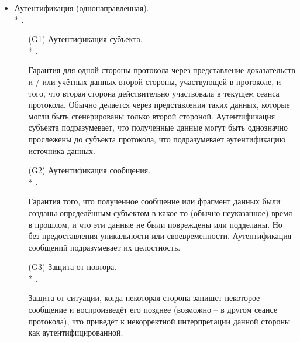 \begin{itemize}
	\item Аутентификация (однонаправленная).\\*
		.
	\begin{itemize}
		\item[(G1)] Аутентификация субъекта.\\*
			.
		\item[{}] Гарантия для одной стороны протокола через представление доказательств и / или учётных данных второй стороны, участвующей в протоколе, и того, что вторая сторона действительно участвовала в текущем сеанса протокола. Обычно делается через представления таких данных, которые могли быть сгенерированы только второй стороной. Аутентификация субъекта подразумевает, что полученные данные могут быть однозначно прослежены до субъекта протокола, что подразумевает аутентификацию источника данных.
		\item[(G2)] Аутентификация сообщения.\\*
			.
		\item[{}] Гарантия того, что полученное сообщение или фрагмент данных были созданы определённым субъектом в какое-то (обычно неуказанное) время в прошлом, и что эти данные не были повреждены или подделаны. Но без предоставления уникальности или своевременности. Аутентификация сообщений подразумевает их целостность.
		\item[(G3)] Защита от повтора.\\*
			.
		\item[{}] Защита от ситуации, когда некоторая сторона запишет некоторое сообщение и воспроизведёт его позднее (возможно -- в другом сеансе протокола), что приведёт к некорректной интерпретации данной стороны как аутентифицированной.
	\end{itemize}


\end{itemize}
